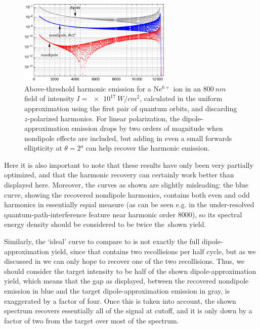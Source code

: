 \begin{figure}[hb]
  \centering
  \includegraphics[width=0.65\textwidth]{9-Nondipole-HHG/Figures/figure9F.pdf} 
  \caption[
  Harmonic emission from a Ne$^{6+}$ ion in an $\SI{800}{nm}$ field of intensity $I=\SI{e17}{W/cm^2}$, showing the damping from nondipole effects and the recovery when the beams are non-collinear
  ]{
  Above-threshold harmonic emission for a Ne$^{6+}$ ion in an $\SI{800}{nm}$ field of intensity $I=\SI{e17}{W/cm^2}$, calculated in the uniform approximation using the first pair of quantum orbits, and discarding $z$-polarized harmonics. For linear polarization, the dipole-approximation emission drops by two orders of magnitude when nondipole effects are included, but adding in even a small forwards ellipticity at $\theta=2\si{\degree}$ can help recover the harmonic emission. 
  }
\label{f8-harmonic-recovery-spectra}
\end{figure}


Here it is also important to note that these results have only been very partially optimized, and that the harmonic recovery can certainly work better than displayed here. Moreover, the curves as shown are slightly misleading: the blue curve, showing the recovered nondipole harmonics, contains both even and odd harmonics in essentially equal measure (as can be seen e.g. in the under-resolved quantum-path-interference feature near harmonic order 8000), so its spectral energy density should be considered to be twice the~shown yield. 

Similarly, the `ideal' curve to compare to is not exactly the full dipole-approximation yield, since that contains two recollisions per half cycle, but as we discussed in  we can only hope to recover one of the two recollisions. Thus, we should consider the target intensity to be half of the shown dipole-approximation yield, which means that the gap as displayed, between the recovered nondipole emission in blue and the target dipole-approximation emission in gray, is exaggerated by a factor of four. Once this is taken into account, the shown spectrum recovers essentially all of the signal at cutoff, and it is only down by a factor of two from the target over most of the spectrum.


